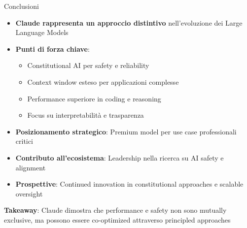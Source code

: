 \documentclass[aspectratio=169]{beamer}
\begin{document}
\begin{frame}{Conclusioni}
\begin{itemize}
    \item \textbf{Claude rappresenta un approccio distintivo} nell'evoluzione dei Large Language Models
    \item \textbf{Punti di forza chiave}:
    \begin{itemize}
        \item Constitutional AI per safety e reliability
        \item Context window esteso per applicazioni complesse
        \item Performance superiore in coding e reasoning
        \item Focus su interpretabilità e trasparenza
    \end{itemize}
    \item \textbf{Posizionamento strategico}: Premium model per use case professionali critici
    \item \textbf{Contributo all'ecosistema}: Leadership nella ricerca su AI safety e alignment
    \item \textbf{Prospettive}: Continued innovation in constitutional approaches e scalable oversight
\end{itemize}

\vspace{0.5cm}
\textbf{Takeaway}: Claude dimostra che performance e safety non sono mutually exclusive, ma possono essere co-optimized attraverso principled approaches
\end{frame}
%
\end{document}
